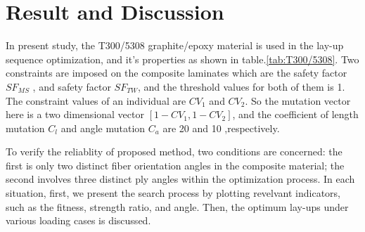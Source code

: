 \section{Result and Discussion}
In present study, the T300/5308 graphite/epoxy material is used in the
lay-up sequence optimization, and it's properties as shown in
table.\ref{tab:T300/5308}. Two constraints are imposed on the composite
laminates which are the safety factor $SF_{MS}$ , and safety factor $SF_{TW}$,
and the threshold values for both of them is 1. The constraint values of an
individual are $CV_1$ and $CV_2$. So the mutation vector here is a two
dimensional vector $[1 - CV_1, 1 - CV_2 ]$, and the coefficient of length
mutation $C_l$ and angle mutation $C_a$ are  20 and 10 ,respectively.

To verify the reliablity of proposed method, two conditions are concerned: the
first is only two distinct fiber orientation angles in the composite material;
the second involves three distinct ply angles within the optimization process.
In each situation, first, we present the search process by plotting revelvant
indicators, such as the fitness, strength ratio, and angle. Then, the optimum
lay-ups under various loading cases is discussed.


